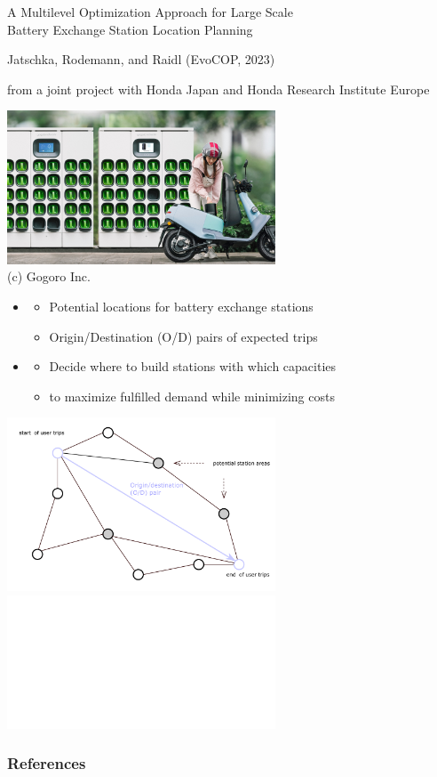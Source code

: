 \documentclass[aspectratio=1610]{beamer}
\begin{document}
\begin{frame}{A Multilevel Optimization Approach for
	Large Scale\\ Battery Exchange Station Location Planning}

Jatschka, Rodemann, and Raidl (EvoCOP, 2023) \cite{jatschka-23}

\medskip
from a joint project with Honda Japan and Honda Research Institute Europe

\bigskip
\begin{center}
	\includegraphics[width=0.6\textwidth]{graphics/Gogoro_Swapping_Station.jpg}\\
	{\small (c) Gogoro Inc.}
\end{center}
\end{frame}

\begin{frame}
\begin{itemize}
\item {} 
	\begin{itemize}
		\item Potential locations for battery exchange stations
		\item Origin/Destination (O/D) pairs of expected trips
	\end{itemize}
\item {}
	\begin{itemize}
		\item Decide where to build stations with which capacities
		\item to maximize fulfilled demand while minimizing costs
	\end{itemize}
\end{itemize}

\begin{center}
	\includegraphics[width=0.6\textwidth]{graphics/graph_second.pdf}
	\includegraphics<2>[width=0.6\textwidth]{graphics/graph_third.pdf}
\end{center}
\end{frame}




\begin{frame}[allowframebreaks]
	\frametitle{References}
	\small
	
\end{frame}
\end{document}
